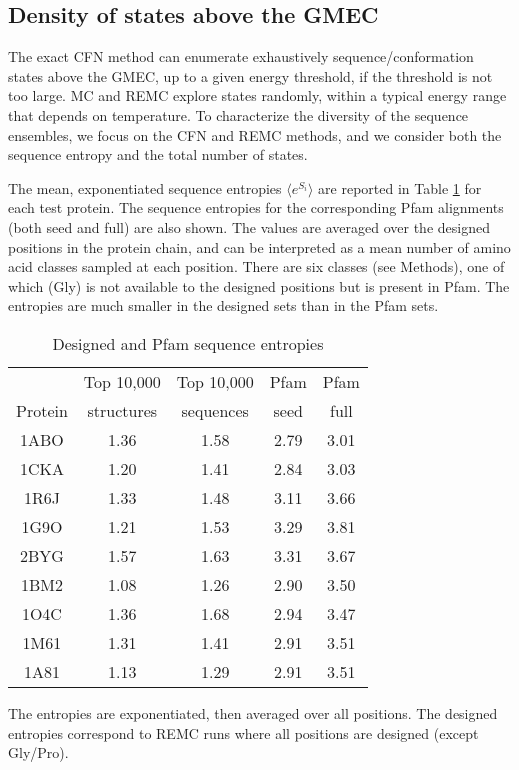\subsection{Density of states above the GMEC}
The exact CFN method can enumerate exhaustively sequence/conformation states above the GMEC, up to a given energy threshold, if the threshold is not too large. MC and REMC explore states randomly, within a typical energy range that depends on temperature. To characterize the diversity of the sequence ensembles, we focus on the CFN and REMC methods, and we consider both the sequence entropy and the total number of states. 

The mean, exponentiated sequence entropies $\langle e^{S_i}\rangle$ are reported in Table \ref{tab:entropy} for each test protein. The sequence entropies for the corresponding Pfam alignments (both seed and full) are also shown. The values are averaged over the designed positions in the protein chain, and can be interpreted as a mean number of amino acid classes sampled at each position. There are six classes (see Methods), one of which (Gly) is not available to the designed positions but is present in Pfam. The entropies are much smaller in the designed sets than in the Pfam sets.


\begin{table}[!htbp]                            
\caption{Designed and Pfam sequence entropies}
\label{tab:entropy}                      
\begin{center}
\begin{tabular}{ccccc} \hline \hline  
        & Top 10,000 & Top 10,000 & Pfam & Pfam \\
Protein & structures & sequences  & seed & full \\ \hline
1ABO & 1.36 & 1.58 & 2.79 & 3.01 \\
1CKA & 1.20 & 1.41 & 2.84 & 3.03 \\
1R6J & 1.33 & 1.48 & 3.11 & 3.66 \\
1G9O & 1.21 & 1.53 & 3.29 & 3.81 \\
2BYG & 1.57 & 1.63 & 3.31 & 3.67 \\
1BM2 & 1.08 & 1.26 & 2.90 & 3.50 \\
1O4C & 1.36 & 1.68 & 2.94 & 3.47 \\
1M61 & 1.31 & 1.41 & 2.91 & 3.51 \\
1A81 & 1.13 & 1.29 & 2.91 & 3.51 \\ \hline
\end{tabular}
\end{center}
{\small \noindent The entropies are exponentiated, then averaged over all positions.
The designed entropies correspond to REMC runs where all positions are designed (except Gly/Pro).}
\end{table}


